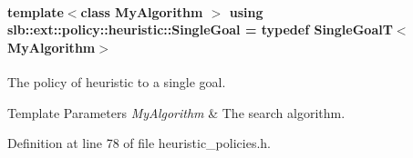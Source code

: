 \paragraph[{\texorpdfstring{Single\+Goal}{SingleGoal}}]{\setlength{\rightskip}{0pt plus 5cm}template$<$class My\+Algorithm $>$ using {\bf slb\+::ext\+::policy\+::heuristic\+::\+Single\+Goal} = typedef {\bf Single\+GoalT}$<$My\+Algorithm$>$}\hypertarget{namespaceslb_1_1ext_1_1policy_1_1heuristic_a6cee0282472a5ca36af95af31fc3513d}{}\label{namespaceslb_1_1ext_1_1policy_1_1heuristic_a6cee0282472a5ca36af95af31fc3513d}


The policy of heuristic to a single goal. 


\begin{DoxyTemplParams}{Template Parameters}
{\em My\+Algorithm} & The search algorithm. \\
\hline
\end{DoxyTemplParams}


Definition at line 78 of file heuristic\+\_\+policies.\+h.

